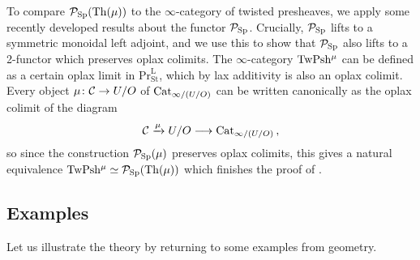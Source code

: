 \documentclass[10pt]{amsart}
\numberwithin{equation}{section}
\theoremstyle{definition}
\DeclareMathOperator{\Th}{Th}
\DeclareMathOperator{\St}{St}
\renewcommand{\Pr}{\mathrm{Pr}}
\newcommand{\rL}{\mathrm{L}}
\newcommand{\PrLSt}{\Pr^{\rL}_{\St}}
\newcommand{\TwShv}{\mathrm{TwPsh}\vphantom{h}}
\newcommand{\Cat}{\mathrm{Cat}\vphantom{t}}
\newcommand{\cC}{\mathcal{C}}
\newcommand{\cP}{\mathcal{P}}
\newcommand{\Sp}{\mathrm{Sp}\vphantom{p}}
\renewcommand{\to}{\mathchoice{\longrightarrow}{\rightarrow}{}{}}
\begin{document}
To compare $\cP_{\Sp}(\Th(\mu))$ to the $\infty$-category of twisted presheaves, we apply some recently developed results about the functor $\cP_{\Sp}$.
Crucially, $\cP_{\Sp}$ lifts to a symmetric monoidal left adjoint, and we use this to show that $\cP_{\Sp}$ also lifts to a 2-functor which preserves oplax colimits.
The $\infty$-category $\TwShv^{\mu}$ can be defined as a certain oplax limit in $\PrLSt$, which by lax additivity \cite{CDW} is also an oplax colimit.
Every object $\mu\colon \cC\to U/O$ of $\Cat_{\infty / (U/O)}$ can be written canonically as the oplax colimit of the diagram
\begin{align*}
	\cC \xrightarrow{\mu}  U/O \to \Cat_{\infty / (U/O)} \,,
\end{align*}
so since the construction $\cP_{\Sp}(\mu)$ preserves oplax colimits, this gives a natural equivalence $\TwShv^{\mu}\simeq \cP_{\Sp}(\Th(\mu))$ which finishes the proof of .

\subsection*{Examples}
Let us illustrate the theory by returning to some examples from geometry.
\end{document}
